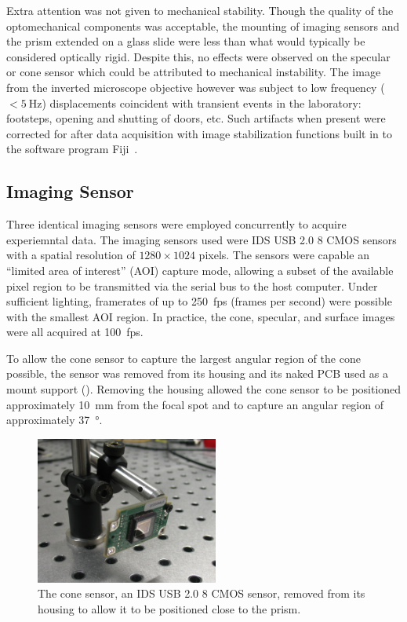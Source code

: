 Extra attention was not given to mechanical stability.  Though the quality
of the optomechanical components was acceptable, the mounting of imaging
sensors and the prism extended on a glass slide were less than what would
typically be considered optically rigid.  Despite this, no effects were
observed on the specular or cone sensor which could be attributed to
mechanical instability.  The image from the inverted microscope objective
however was subject to low frequency ($<\SI{5}{\hertz}$) displacements
coincident with transient events in the laboratory: footsteps, opening and
shutting of doors, etc.  Such artifacts when present were corrected for
after data acquisition with image stabilization functions built in to the
software program Fiji~\cite{schindelin2012fiji}.

\subsection{Imaging Sensor}

Three identical imaging sensors were employed concurrently to acquire
experiemntal data.  The imaging sensors used were IDS USB 2.0 \SI{8}{\bit}
CMOS sensors with a spatial resolution of $1280\times1024$ pixels.  The
sensors were capable an ``limited area of interest'' (AOI) capture mode,
allowing a subset of the available pixel region to be transmitted via the
serial bus to the host computer.  Under sufficient lighting, framerates of
up to \SI{250}{fps} (frames per second) were possible with the smallest AOI
region.  In practice, the cone, specular, and surface images were all
acquired at \SI{100}{fps}.

To allow the cone sensor to capture the largest angular region of the cone
possible, the sensor was removed from its housing and its naked PCB used as
a mount support ().  Removing the housing allowed
the cone sensor to be positioned approximately \SI{10}{\milli\meter} from
the focal spot and to capture an angular region of approximately
\SI{37}{\degree}.
\begin{figure}[ht]
 \centering
 \includegraphics[width=6cm,keepaspectratio]{experimental/figures/nakedsensorcrop.jpg}
	\caption{The cone sensor, an IDS USB 2.0 \SI{8}{\bit} CMOS sensor, removed
	from its housing to allow it to be positioned close to the prism.}
 \label{fig:imagingsensor}
\end{figure}

